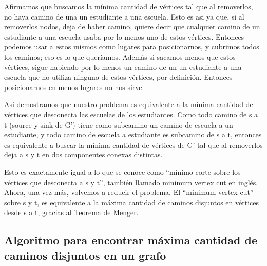 \par{Afirmamos que buscamos la mínima cantidad de vértices tal que al removerlos, no haya camino de una un estudiante a una escuela. 
Esto es asi ya que, si al removerlos nodos, deja de haber camino, quiere decir que cualquier camino de un estudiante a una escuela usaba por lo menos uno de estos vértices. 
Entonces podemos usar a estos mismos como lugares para posicionarnos, y cubrimos todos los caminos; eso es lo que queríamos. Además si sacamos menos que estos vértices, sigue habiendo por lo menos un camino de un un estudiante a una escuela que no utiliza ninguno de estos vértices, por definición. Entonces posicionarnos en menos lugares no nos sirve. }
\par{
Asi demostramos que nuestro problema es equivalente a la mínima cantidad de vértices que desconecta las escuelas de los estudiantes. 
Como todo camino de s a t (source y sink de G’) tiene como subcamino un camino de escuela a un estudiante, y todo camino de escuela a estudiante es subcamino de s a t, entonces es equivalente a buscar la mínima cantidad de vértices de G’ tal que al removerlos deja a s y t en dos componentes conexas distintas.}
\par{
Esto es exactamente igual a lo que se conoce como “mínimo corte sobre los vértices que desconecta a s y t”, también llamado minimum vertex cut en inglés.
Ahora, una vez más, volvemos a reducir el problema. El “minimum vertex cut”  sobre s y t, es equivalente a la máxima cantidad de caminos disjuntos en vértices desde s a t, gracias al Teorema de Menger.}

\subsection{Algoritmo para encontrar máxima cantidad de caminos disjuntos en un grafo}

